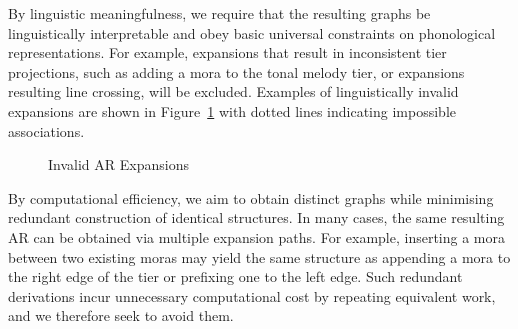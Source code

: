 By linguistic meaningfulness, we require that the resulting graphs be
linguistically interpretable and obey basic universal constraints on
phonological representations. For example, expansions that result in
inconsistent tier projections, such as adding a mora to the tonal
melody tier, or expansions resulting line crossing, will be excluded. Examples of linguistically
invalid expansions are shown in Figure~\ref{fig.invalid.AR}
with dotted lines indicating impossible associations.
\begin{figure}[h]
	\centering
		 \hfil
		 \hfil
		\hfil
		
		\caption{Invalid AR Expansions}
	\label{fig.invalid.AR}
\end{figure}
By computational efficiency, we aim to obtain distinct graphs while
minimising redundant construction of identical structures. In many
cases, the same resulting AR can be obtained via multiple expansion
paths. For example, inserting a mora between two existing moras may
yield the same structure as appending a mora to the right edge of the
tier or prefixing one to the left edge. Such redundant derivations
incur unnecessary computational cost by repeating equivalent work, and
we therefore seek to avoid them.

